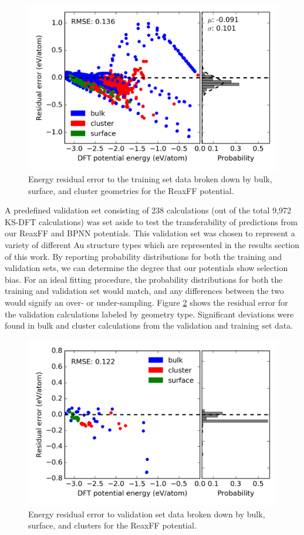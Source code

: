 \documentclass[12pt]{cmuthesis}
\begin{document}
\begin{figure}[h]
\centering
\includegraphics[width=5in]{./images/fig-reax-train.png}
\caption{\label{fig-reax-train}
Energy residual error to the training set data broken down by bulk, surface, and cluster geometries for the ReaxFF potential.}
\end{figure}

A predefined validation set consisting of 238 calculations (out of the total 9,972 KS-DFT calculations) was set aside to test the transferability of predictions from our ReaxFF and BPNN potentials. This validation set was chosen to represent a variety of different Au structure types which are represented in the results section of this work. By reporting probability distributions for both the training and validation sets, we can determine the degree that our potentials show selection bias. For an ideal fitting procedure, the probability distributions for both the training and validation set would match, and any differences between the two would signify an over- or under-sampling. Figure \ref{fig-reax-valid} shows the residual error for the validation calculations labeled by geometry type. Significant deviations were found in bulk and cluster calculations from the validation and training set data.

\begin{figure}[h]
\centering
\includegraphics[width=5in]{./images/fig-reax-valid.png}
\caption{\label{fig-reax-valid}
Energy residual error to validation set data broken down by bulk, surface, and clusters for the ReaxFF potential.}
\end{figure}
\end{document}
